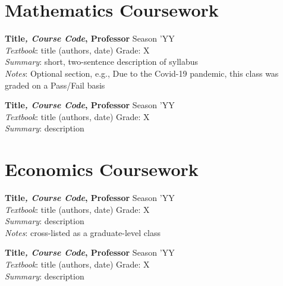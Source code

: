 \documentclass[letterpaper, 12pt]{article}
\newcommand{\banner}[1]{{\normalsize\bfseries #1}}
\newcommand{\subbanner}[1]{{\small\itshape #1}}
\newcommand{\rhs}[1]{{\small #1}}
\newcommand{\key}[1]{{\small\itshape #1}}
\newcommand{\val}[1]{{\small #1}}
\newcommand{\quadruple}[4]{\pair{{\banner{#1}}\subbanner{, #2}, \textnormal{\small #4}}{\rhs{#3}}}
\newcommand{\pair}[2]{\banner{#1} \hfill \rhs{#2}}
\newcommand{\pairsimple}[2]{#1 \hfill #2}
\newcommand{\keyval}[2]{\key{#1}: \val{#2}}
\newcommand{\entryspace}{\vspace{8pt}}
\begin{document}

\section*{Mathematics Coursework}

\quadruple{Title}{Course Code}{Season 'YY}{Professor} \\
\pairsimple{\keyval{Textbook}{title (authors, date)}}{\rhs{Grade: X}} \\
\keyval{Summary}{short, two-sentence description of syllabus} \\
\keyval{Notes}{Optional section, e.g., Due to the Covid-19 pandemic, this class was graded on a Pass/Fail basis}

\entryspace

\quadruple{Title}{Course Code}{Season 'YY}{Professor} \\
\pairsimple{\keyval{Textbook}{title (authors, date)}}{\rhs{Grade: X}} \\
\keyval{Summary}{description}

\newpage

\section*{Economics Coursework}

\quadruple{Title}{Course Code}{Season 'YY}{Professor} \\
\pairsimple{\keyval{Textbook}{title (authors, date)}}{\rhs{Grade: X}} \\
\keyval{Summary}{description} \\
\keyval{Notes}{cross-listed as a graduate-level class}

\entryspace

\quadruple{Title}{Course Code}{Season 'YY}{Professor} \\
\pairsimple{\keyval{Textbook}{title (authors, date)}}{\rhs{Grade: X}} \\
\keyval{Summary}{description}
\end{document}
